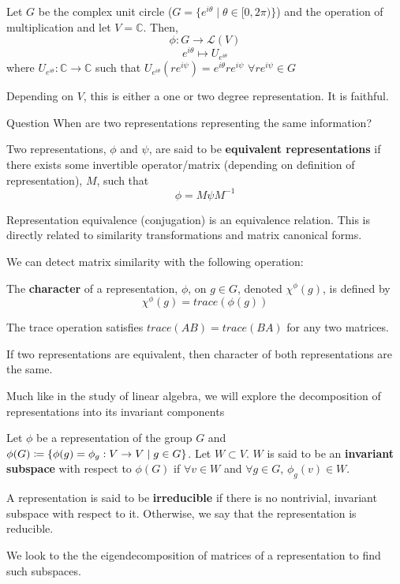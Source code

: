 \documentclass[compress,aspectratio=169,10pt,usenames,dvipsnames]{beamer}
\newcommand{\C}{\mathbb{C}}
\begin{document}
\begin{frame}
\vfill
\begin{example}
	Let $G$ be the complex unit circle ($G=\{e^{i\theta} \mid \theta\in[0,2\pi)\}$) and the operation of multiplication and let $V = \mathbb{C}$. Then, 
$$\phi:G\rightarrow \mathcal{L}(V)$$
$$e^{i\theta}\mapsto U_{e^{i\theta}}$$
where $U_{e^{i\theta}}:\C \rightarrow \C$ such that $U_{e^{i\theta}}(re^{i\psi}) = e^{i\theta}re^{i\psi}$ $\forall re^{i\psi}\in G$
\end{example}
\vfill
Depending on $V$, this is either a one or two degree representation. It is faithful.
\end{frame}
%
%
\begin{frame}
\vfill
\begin{block}{Question}
	When are two representations representing the same information?
\end{block}
\vfill
{}
\begin{definition}
	Two representations, $\phi$ and $\psi$, are said to be \textbf{equivalent representations} if there exists some invertible operator/matrix (depending on definition of representation), $M$, such that $$\phi = M \psi M^{-1}$$
\end{definition}
\vfill
Representation equivalence (conjugation) is an equivalence relation.
\vfill
This is directly related to similarity transformations and matrix canonical forms.
\vfill
\end{frame}
%
%
\begin{frame}
\vfill
We can detect matrix similarity with the following operation:
\vfill
\begin{definition}
	The \textbf{character} of a representation, $\phi$, on $g \in G$, denoted $\chi^{\phi}(g)$, is defined by $$\chi^{\phi}(g)=trace(\phi(g))$$
\end{definition}
\vfill
The trace operation satisfies $trace(AB)=trace(BA)$ for any two matrices.
\vfill
\begin{theorem}
	If two representations are equivalent, then character of both representations are the same.
\end{theorem}
\vfill
\end{frame}
%
%
\begin{frame}
\vfill
Much like in the study of linear algebra, we will explore the decomposition of representations into its invariant components
\vfill
\begin{definition}
	Let $\phi$ be a representation of the group $G$ and $\phi(G) \coloneq \{\phi(g)=\phi_g: V\rightarrow V \hspace{1mm}| \hspace{1mm} g\in G\}$. Let $W \subset V$. $W$ is said to be an \textbf{invariant subspace} with respect to $\phi(G)$ if $\forall v \in W$ and $\forall g \in G$, $\phi_g(v)\in W$.
\end{definition}
\vfill
\begin{definition}
	A representation is said to be \textbf{irreducible} if there is no nontrivial, invariant subspace with respect to it. Otherwise, we say that the representation is reducible.
\end{definition}
\vfill
We look to the the eigendecomposition of matrices of a representation to find such subspaces.
\end{frame}
\end{document}
